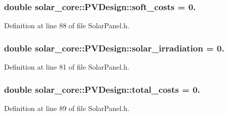 \hypertarget{classsolar__core_1_1_p_v_design_ac1220011d65d7cc442cd143f93123f31}{}
\subsubsection[{soft\+\_\+costs}]{\setlength{\rightskip}{0pt plus 5cm}double solar\+\_\+core\+::\+P\+V\+Design\+::soft\+\_\+costs = 0.}\label{classsolar__core_1_1_p_v_design_ac1220011d65d7cc442cd143f93123f31}


Definition at line 88 of file Solar\+Panel.\+h.

\hypertarget{classsolar__core_1_1_p_v_design_ae74d98b592c49c7bb44a2e2ec07093c4}{}
\subsubsection[{solar\+\_\+irradiation}]{\setlength{\rightskip}{0pt plus 5cm}double solar\+\_\+core\+::\+P\+V\+Design\+::solar\+\_\+irradiation = 0.}\label{classsolar__core_1_1_p_v_design_ae74d98b592c49c7bb44a2e2ec07093c4}


Definition at line 81 of file Solar\+Panel.\+h.

\hypertarget{classsolar__core_1_1_p_v_design_ac015f1cf090279e45861f2860f008cc2}{}
\subsubsection[{total\+\_\+costs}]{\setlength{\rightskip}{0pt plus 5cm}double solar\+\_\+core\+::\+P\+V\+Design\+::total\+\_\+costs = 0.}\label{classsolar__core_1_1_p_v_design_ac015f1cf090279e45861f2860f008cc2}


Definition at line 89 of file Solar\+Panel.\+h.

\hypertarget{classsolar__core_1_1_p_v_design_a7628fe2e1ea95f8df79aca11dd5a356d}{}
